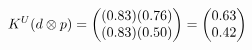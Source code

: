 \documentclass[preview]{standalone}
\begin{document}
\begin{align*}
\special{dvisvgm:raw <g id='unique000'>}K^U(d \otimes p) = \begin{pmatrix} (0.83)(0.76) \\ (0.83)(0.50) \end{pmatrix} = \begin{pmatrix} 0.63 \\ 0.42 \end{pmatrix}\special{dvisvgm:raw </g>}
\end{align*}
\end{document}
